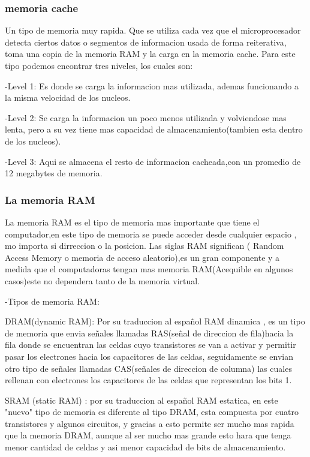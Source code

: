 \documentclass{article}
\begin{document}
        \subsubsection{memoria cache}
        Un tipo de memoria muy rapida. Que se utiliza cada vez que el microprocesador detecta ciertos datos o segmentos de informacion usada de forma reiterativa, toma una copia de la memoria RAM y la carga en la memoria cache. Para este tipo podemos encontrar tres niveles, los cuales son:
            
            -Level 1: Es donde se carga la informacion mas utilizada, ademas funcionando a la misma velocidad de los nucleos.
            
            -Level 2: Se carga la informacion un poco menos utilizada y volviendose mas lenta, pero a su vez tiene mas capacidad de almacenamiento(tambien esta dentro de los nucleos).
            
            -Level 3: Aqui se almacena el resto de informacion cacheada,con un promedio de 12 megabytes de memoria.
        
        \subsubsection{La memoria RAM}
        La memoria RAM es el tipo de memoria mas importante que tiene el computador,en este tipo de memoria se puede acceder desde cualquier espacio , mo importa si dirreccion o la posicion. Las siglas RAM significan ( Random Access Memory o memoria de acceso aleatorio),es un gran componente y a medida que el computadoras tengan mas memoria RAM(Acequible en algunos casos)este no dependera tanto de la memoria virtual.
        
        -Tipos de memoria RAM:
            
            DRAM(dynamic RAM): Por su traduccion al español RAM dinamica , es un tipo de memoria que envia señales llamadas RAS(señal de direccion de fila)hacia la fila donde se encuentran las celdas cuyo transistores se van a activar y permitir  pasar los electrones hacia los capacitores de las celdas, seguidamente se envian otro tipo de señales llamadas CAS(señales de direccion de columna) las cuales  rellenan con electrones los capacitores de las celdas que representan los bits 1.
            
            SRAM (static RAM) : por su traduccion al español RAM estatica, en este "nuevo" tipo de memoria es diferente al tipo DRAM, esta compuesta por cuatro transistores y algunos circuitos, y gracias a esto permite ser mucho mas rapida que la memoria DRAM, aunque al ser mucho mas grande esto hara que tenga menor cantidad de celdas y asi menor capacidad de bits de almacenamiento.
            
\end{document}
